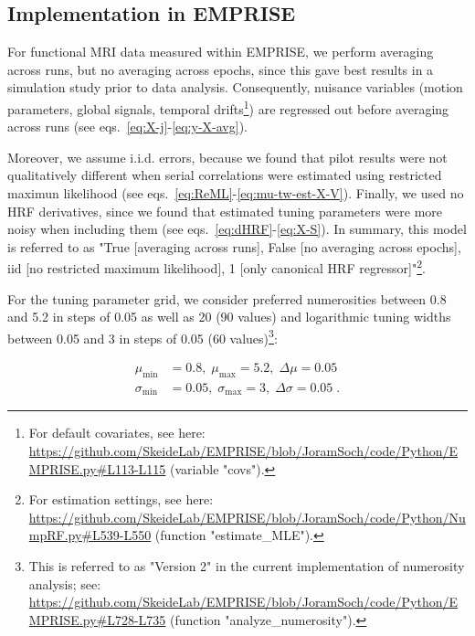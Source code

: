 \documentclass[a4paper,12pt]{article}
\begin{document}
\subsection{Implementation in EMPRISE}

For functional MRI data measured within EMPRISE, we perform averaging across runs, but no averaging across epochs, since this gave best results in a simulation study prior to data analysis. Consequently, nuisance variables (motion parameters, global signals, temporal drifts\footnote{For default covariates, see here: \url{https://github.com/SkeideLab/EMPRISE/blob/JoramSoch/code/Python/EMPRISE.py#L113-L115} (variable "covs").}) are regressed out before averaging across runs (see eqs.~\ref{eq:X-j}-\ref{eq:y-X-avg}).

Moreover, we assume i.i.d. errors, because we found that pilot results were not qualitatively different when serial correlations were estimated using restricted maximun likelihood (see eqs.~\ref{eq:ReML}-\ref{eq:mu-tw-est-X-V}). Finally, we used no HRF derivatives, since we found that estimated tuning parameters were more noisy when including them (see eqs.~\ref{eq:dHRF}-\ref{eq:X-S}). In summary, this model is referred to as "True [averaging across runs], False [no averaging across epochs], iid [no restricted maximum likelihood], 1 [only canonical HRF regressor]"\footnote{For estimation settings, see here: \url{https://github.com/SkeideLab/EMPRISE/blob/JoramSoch/code/Python/NumpRF.py#L539-L550} (function "estimate\_MLE").}.

\pagebreak
For the tuning parameter grid, we consider preferred numerosities between 0.8 and 5.2 in steps of 0.05 as well as 20 (90 values) and logarithmic tuning widths between 0.05 and 3 in steps of 0.05 (60 values)\footnote{This is referred to as "Version 2" in the current implementation of numerosity analysis; see: \url{https://github.com/SkeideLab/EMPRISE/blob/JoramSoch/code/Python/EMPRISE.py#L728-L735} (function "analyze\_numerosity").}:

\vspace{-0.5em}
\begin{equation} \label{eq:fgs-EMPRISE}
\begin{split}
\mu_\mathrm{min} &= 0.8, \; \mu_\mathrm{max} = 5.2, \; \Delta \mu = 0.05 \\
\sigma_\mathrm{min} &= 0.05, \; \sigma_\mathrm{max} = 3, \; \Delta \sigma = 0.05 \; .
\end{split}
\end{equation}
\end{document}
